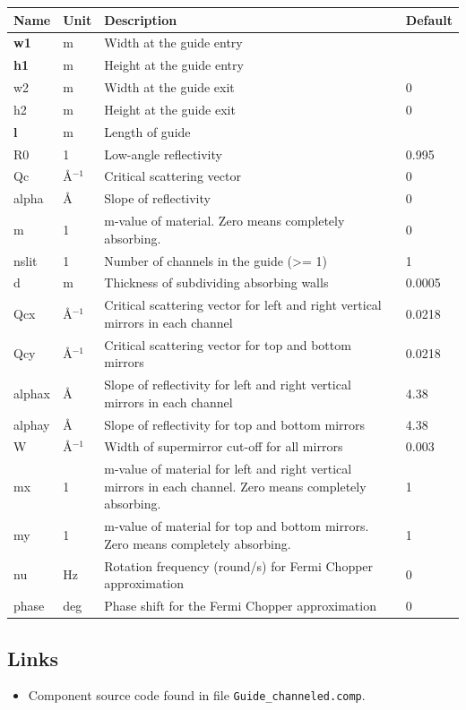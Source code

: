 \begin{longtable}{p{}p{}p{}p{}}
\toprule
\textbf{Name} & \textbf{Unit} & \textbf{Description} & \textbf{Default} \\
\midrule
\endhead
\textbf{w1} & m & Width at the guide entry &  \\
\textbf{h1} & m & Height at the guide entry &  \\
w2 & m & Width at the guide exit & 0 \\
h2 & m & Height at the guide exit & 0 \\
\textbf{l} & m & Length of guide &  \\
R0 & 1 & Low-angle reflectivity & 0.995 \\
Qc & \AA{}$^{-1}$ & Critical scattering vector & 0 \\
alpha & \AA{} & Slope of reflectivity & 0 \\
m & 1 & m-value of material. Zero means completely absorbing. & 0 \\
nslit & 1 & Number of channels in the guide (\textgreater{}= 1) & 1 \\
d & m & Thickness of subdividing absorbing walls & 0.0005 \\
Qcx & \AA{}$^{-1}$ & Critical scattering vector for left and right vertical mirrors in each channel & 0.0218 \\
Qcy & \AA{}$^{-1}$ & Critical scattering vector for top and bottom mirrors & 0.0218 \\
alphax & \AA{} & Slope of reflectivity for left and right vertical mirrors in each channel & 4.38 \\
alphay & \AA{} & Slope of reflectivity for top and bottom mirrors & 4.38 \\
W & \AA{}$^{-1}$ & Width of supermirror cut-off for all mirrors & 0.003 \\
mx & 1 & m-value of material for left and right vertical mirrors in each channel. Zero means completely absorbing. & 1 \\
my & 1 & m-value of material for top and bottom mirrors. Zero means completely absorbing. & 1 \\
nu & Hz & Rotation frequency (round/s) for Fermi Chopper approximation & 0 \\
phase & deg & Phase shift for the Fermi Chopper approximation & 0 \\
\bottomrule
\end{longtable}

\subsection*{Links}
\begin{itemize}
  \item Component source code found in file \texttt{Guide\_channeled.comp}.
\end{itemize}
